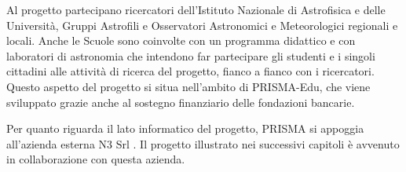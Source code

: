 Al progetto partecipano ricercatori dell'Istituto Nazionale di Astrofisica e delle Università, Gruppi Astrofili e Osservatori Astronomici e Meteorologici regionali e locali. Anche le Scuole sono coinvolte con un programma didattico e con laboratori di astronomia che intendono far partecipare gli studenti e i singoli cittadini alle attività di ricerca del progetto, fianco a fianco con i ricercatori. Questo aspetto del progetto si situa nell'ambito di PRISMA-Edu, che viene sviluppato grazie anche al sostegno finanziario delle fondazioni bancarie. \cite{progetto-PRISMA}

Per quanto riguarda il lato informatico del progetto, PRISMA si appoggia all'azienda esterna N3 Srl \cite{n3srl}. Il progetto illustrato nei successivi capitoli è avvenuto in collaborazione con questa azienda.